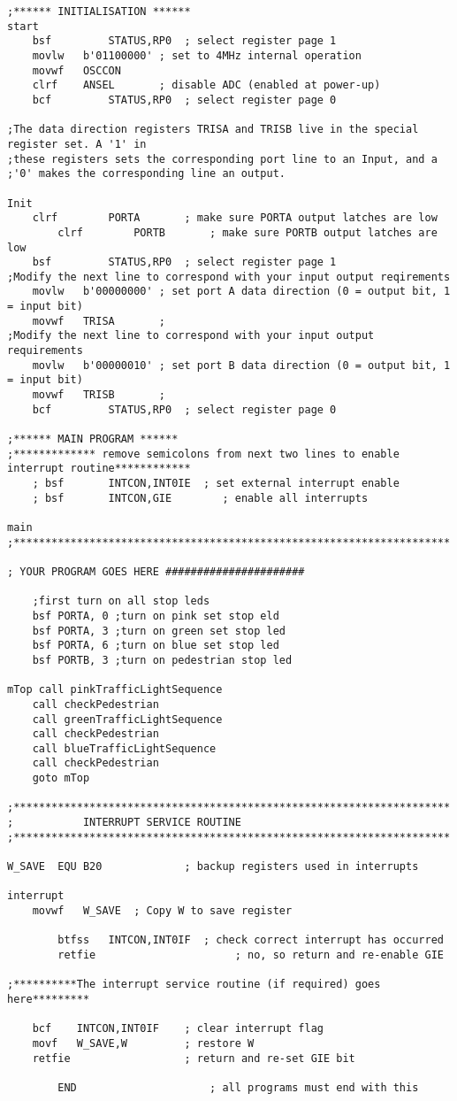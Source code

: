 \begin{lstlisting}[language={[x86masm]Assembler}, style=assembly, caption=Full code listing]
;****** INITIALISATION ******
start
	bsf     	STATUS,RP0	; select register page 1
	movlw  	b'01100000'	; set to 4MHz internal operation
	movwf	OSCCON	
	clrf	ANSEL		; disable ADC (enabled at power-up)
	bcf     	STATUS,RP0	; select register page 0

;The data direction registers TRISA and TRISB live in the special register set. A '1' in
;these registers sets the corresponding port line to an Input, and a
;'0' makes the corresponding line an output.

Init
	clrf    	PORTA     	; make sure PORTA output latches are low
    	clrf    	PORTB     	; make sure PORTB output latches are low   
	bsf     	STATUS,RP0	; select register page 1
;Modify the next line to correspond with your input output reqirements	
	movlw	b'00000000'	; set port A data direction (0 = output bit, 1 = input bit)
	movwf	TRISA		; 
;Modify the next line to correspond with your input output requirements	
	movlw	b'00000010'	; set port B data direction (0 = output bit, 1 = input bit)
	movwf	TRISB		; 	
	bcf     	STATUS,RP0	; select register page 0

;****** MAIN PROGRAM ******
;************* remove semicolons from next two lines to enable interrupt routine************
   	; bsf    	INTCON,INT0IE  ; set external interrupt enable
   	; bsf    	INTCON,GIE        ; enable all interrupts 

main 
;*********************************************************************

; YOUR PROGRAM GOES HERE ######################

	;first turn on all stop leds
	bsf PORTA, 0 ;turn on pink set stop eld
	bsf PORTA, 3 ;turn on green set stop led
	bsf PORTA, 6 ;turn on blue set stop led
	bsf PORTB, 3 ;turn on pedestrian stop led

mTop call pinkTrafficLightSequence
	call checkPedestrian
	call greenTrafficLightSequence
	call checkPedestrian
	call blueTrafficLightSequence
	call checkPedestrian
	goto mTop

;*********************************************************************
;			INTERRUPT SERVICE ROUTINE
;*********************************************************************

W_SAVE	EQU B20     		; backup registers used in interrupts

interrupt
	movwf 	W_SAVE 	; Copy W to save register
	
    	btfss  	INTCON,INT0IF  ; check correct interrupt has occurred
    	retfie                		; no, so return and re-enable GIE

;**********The interrupt service routine (if required) goes here*********

   	bcf    INTCON,INT0IF  	; clear interrupt flag 
	movf   W_SAVE,W       	; restore W
	retfie             		; return and re-set GIE bit
	
    	END                		; all programs must end with this

 
\end{lstlisting}